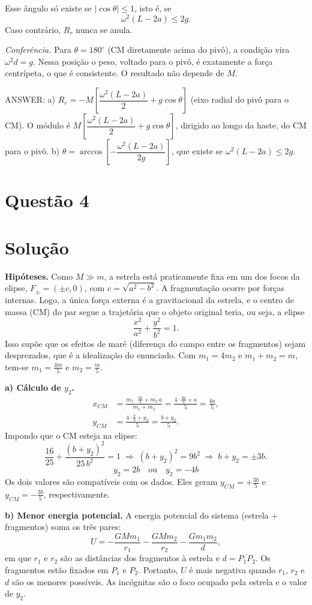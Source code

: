 \documentclass{article}%
\begin{document}
Esse ângulo só existe se $\left|\cos\theta\right|\le 1$, isto é, se
\[
\omega^{2}(L-2a)\le 2g .
\]
Caso contrário, $R_r$ nunca se anula.

\emph{Conferência.} Para $\theta=180^\circ$ (CM diretamente acima do pivô), a condição vira $\omega^{2}d=g$. Nessa posição o peso, voltado para o pivô, é exatamente a força centrípeta, o que é consistente. O resultado não depende de $M$.

\medskip
\noindent ANSWER: a) $R_r=-M\left[\dfrac{\omega^{2}(L-2a)}{2}+g\cos\theta\right]$ (eixo radial do pivô para o CM). O módulo é $M\left[\dfrac{\omega^{2}(L-2a)}{2}+g\cos\theta\right]$, dirigido ao longo da haste, do CM para o pivô. b) $\theta=\arccos\!\left[-\dfrac{\omega^{2}(L-2a)}{2g}\right]$, que existe se $\omega^{2}(L-2a)\le 2g$.%
\newpage%
\section*{Questão 4}

\section*{Solução}

\textbf{Hipóteses.} Como $M\gg m$, a estrela está praticamente fixa em um dos focos da elipse, $F_\pm=(\pm c,0)$, com $c=\sqrt{a^2-b^2}$. A fragmentação ocorre por forças internas. Logo, a única força externa é a gravitacional da estrela, e o centro de massa (CM) do par segue a trajetória que o objeto original teria, ou seja, a elipse
\[
\frac{x^2}{a^2}+\frac{y^2}{b^2}=1 .
\]
Isso supõe que os efeitos de maré (diferença do campo entre os fragmentos) sejam desprezados, que é a idealização do enunciado. Com $m_1=4m_2$ e $m_1+m_2=m$, tem-se $m_1=\tfrac{4m}{5}$ e $m_2=\tfrac{m}{5}$.

\textbf{a) Cálculo de $y_2$.}
\begin{align*}
x_{CM}&=\frac{m_1\cdot\frac{3a}{4}+m_2\,a}{m_1+m_2}=\frac{4\cdot\frac{3a}{4}+a}{5}=\frac{4a}{5},\\
y_{CM}&=\frac{4\cdot\frac{b}{4}+y_2}{5}=\frac{b+y_2}{5}.
\end{align*}
Impondo que o CM esteja na elipse:
\[
\frac{16}{25}+\frac{(b+y_2)^2}{25\,b^2}=1\;\Rightarrow\;(b+y_2)^2=9b^2\;\Rightarrow\;b+y_2=\pm 3b .
\]
\[
\boxed{y_2=2b\quad\text{ou}\quad y_2=-4b}
\]
Os dois valores são compatíveis com os dados. Eles geram $y_{CM}=+\tfrac{3b}{5}$ e $y_{CM}=-\tfrac{3b}{5}$, respectivamente.

\textbf{b) Menor energia potencial.} A energia potencial do sistema (estrela + fragmentos) soma os três pares:
\[
U=-\frac{GMm_1}{r_1}-\frac{GMm_2}{r_2}-\frac{Gm_1m_2}{d},
\]
em que $r_1$ e $r_2$ são as distâncias dos fragmentos à estrela e $d=\overline{P_1P_2}$. Os fragmentos estão fixados em $P_1$ e $P_2$. Portanto, $U$ é mais negativa quando $r_1$, $r_2$ e $d$ são os menores possíveis. As incógnitas são o foco ocupado pela estrela e o valor de $y_2$.
\end{document}
